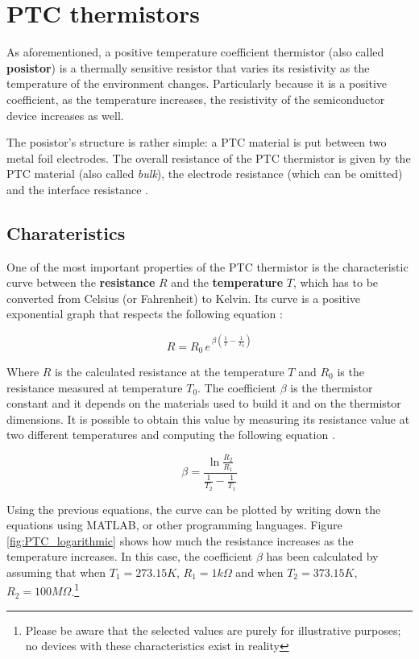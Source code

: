 \vspace{30px}\section{PTC thermistors}
As aforementioned, a positive temperature coefficient thermistor (also called \textbf{posistor}) is a thermally sensitive resistor that varies its resistivity as the temperature of the environment changes. Particularly because it is a positive coefficient, as the temperature increases, the resistivity of the semiconductor device increases as well.

The posistor's structure is rather simple: a PTC material is put between two metal foil electrodes. The overall resistance of the PTC thermistor is given by the PTC material (also called \textsl{bulk}), the electrode resistance (which can be omitted) and the interface resistance \cite{Tang2023}. 

\subsection{Charateristics}
One of the most important properties of the PTC thermistor is the characteristic curve between the \textbf{resistance} $R$ and the \textbf{temperature} $T$, which has to be converted from Celsius (or Fahrenheit) to Kelvin. Its curve is a positive exponential graph that respects the following equation \cite{Saburi196353}\cite{jones2010biomedical}:

\begin{equation*}
    R = R_0 \, e^{\, \beta\left( \frac{1}{T} - \frac{1}{T_0}\right)}
\end{equation*}

\noindent Where $R$ is the calculated resistance at the temperature $T$ and $R_0$ is the resistance measured at temperature $T_0$. The coefficient $\beta$ is the thermistor constant and it depends on the materials used to build it and on the thermistor dimensions. It is possible to obtain this value by measuring its resistance value at two different temperatures and computing the following equation \cite{Saburi196353}.

\begin{equation*}
    \beta = \frac{\ln{\frac{R_2}{R_1}}}{\frac{1}{T_2} - \frac{1}{T_1}}
\end{equation*}

\noindent Using the previous equations, the curve can be plotted by writing down the equations using MATLAB, or other programming languages. Figure \ref{fig:PTC_logarithmic} shows how much the resistance increases as the temperature increases. In this case, the coefficient $\beta$ has been calculated by assuming that when $T_1 = 273.15 K$, $R_1 = 1k\Omega$ and when $T_2 = 373.15 K$, $R_2 = 100M\Omega$.\footnote{Please be aware that the selected values are purely for illustrative purposes; no devices with these characteristics exist in reality}

